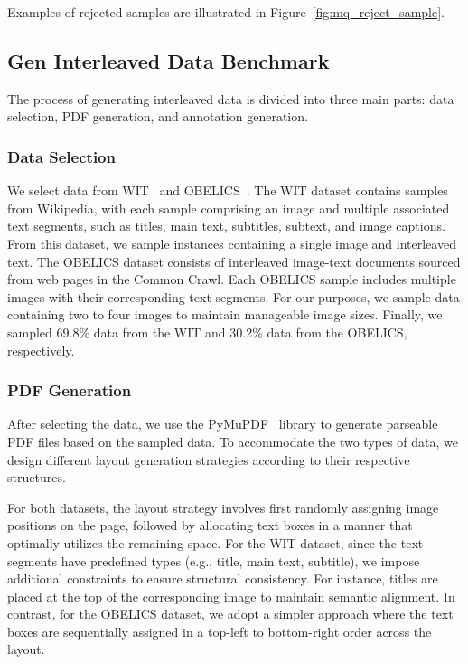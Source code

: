 Examples of rejected samples are illustrated in Figure~\ref{fig:mq_reject_sample}.




\subsection{Gen Interleaved Data Benchmark}
\label{sec:interleave}
The process of generating interleaved data is divided into three main parts: data selection, PDF generation, and annotation generation.
\subsubsection{Data Selection}
We select data from WIT~\cite{wit} and OBELICS~\cite{obelics}. 
The WIT dataset contains samples from Wikipedia, with each sample comprising an image and multiple associated text segments, such as titles, main text, subtitles, subtext, and image captions. From this dataset, we sample instances containing a single image and interleaved text. 
The OBELICS dataset consists of interleaved image-text documents sourced from web pages in the Common Crawl. Each OBELICS sample includes multiple images with their corresponding text segments. For our purposes, we sample data containing two to four images to maintain manageable image sizes. 
Finally, we sampled 69.8\% data from the WIT and 30.2\% data from the OBELICS, respectively.
\subsubsection{PDF Generation}
After selecting the data, we use the PyMuPDF~\cite{pymupdf} library to generate parseable PDF files based on the sampled data. To accommodate the two types of data, we design different layout generation strategies according to their respective structures.

For both datasets, the layout strategy involves first randomly assigning image positions on the page, followed by allocating text boxes in a manner that optimally utilizes the remaining space. For the WIT dataset, since the text segments have predefined types (e.g., title, main text, subtitle), we impose additional constraints to ensure structural consistency. For instance, titles are placed at the top of the corresponding image to maintain semantic alignment. In contrast, for the OBELICS dataset, we adopt a simpler approach where the text boxes are sequentially assigned in a top-left to bottom-right order across the layout.

